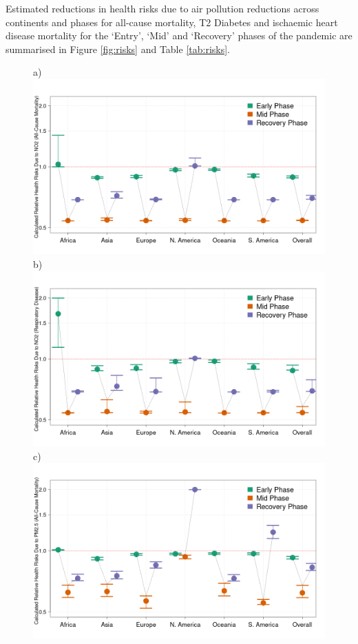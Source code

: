 \documentclass[preprint,10pt]{elsarticle} %
\begin{document}
Estimated reductions in health risks due to air pollution reductions across continents and phases for all-cause mortality, T2 Diabetes and ischaemic heart disease mortality for the `Entry', `Mid' and `Recovery' phases of the pandemic are summarised in Figure \ref{fig:risks} and Table \ref{tab:risks}. 

\begin{figure}
\centering
\scriptsize{a})\includegraphics[trim={0 0 25 23},clip,scale=0.23]{Images/no2risks.png}
\scriptsize{b})\includegraphics[trim={0 0 25 23},clip,scale=0.23]{Images/no2respiratoryrisks.png}
\\
\scriptsize{c)}\includegraphics[trim={0 0 25 23},clip,scale=0.23]{Images/pm25risks.png}

\end{figure}
\end{document}
